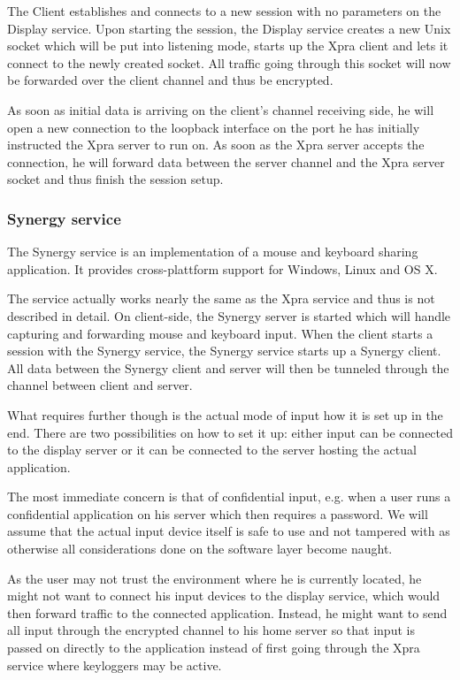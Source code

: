 The Client establishes and connects to a new session with no parameters on the Display service.
Upon starting the session, the Display service creates a new Unix socket which will be put into listening mode, starts up the Xpra client and lets it connect to the newly created socket.
All traffic going through this socket will now be forwarded over the client channel and thus be encrypted.

As soon as initial data is arriving on the client's channel receiving side, he will open a new connection to the loopback interface on the port he has initially instructed the Xpra server to run on.
As soon as the Xpra server accepts the connection, he will forward data between the server channel and the Xpra server socket and thus finish the session setup.

\subsubsection{Synergy service}
\label{sec:synergy-service}

The Synergy service is an implementation of a mouse and keyboard sharing application.
It provides cross-plattform support for Windows, Linux and OS X.

The service actually works nearly the same as the Xpra service and thus is not described in detail.
On client-side, the Synergy server is started which will handle capturing and forwarding mouse and keyboard input.
When the client starts a session with the Synergy service, the Synergy service starts up a Synergy client.
All data between the Synergy client and server will then be tunneled through the channel between client and server.

\medskip

What requires further though is the actual mode of input how it is set up in the end.
There are two possibilities on how to set it up: either input can be connected to the display server or it can be connected to the server hosting the actual application.

The most immediate concern is that of confidential input, e.g. when a user runs a confidential application on his server which then requires a password.
We will assume that the actual input device itself is safe to use and not tampered with as otherwise all considerations done on the software layer become naught.

As the user may not trust the environment where he is currently located, he might not want to connect his input devices to the display service, which would then forward traffic to the connected application.
Instead, he might want to send all input through the encrypted channel to his home server so that input is passed on directly to the application instead of first going through the Xpra service where keyloggers may be active.

